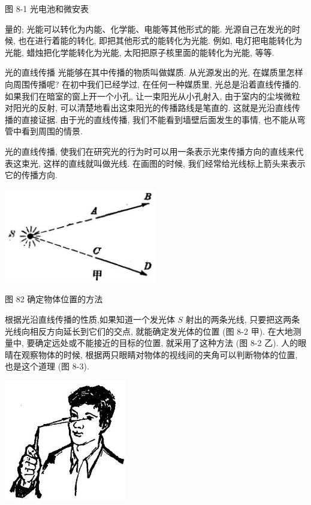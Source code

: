\documentclass[10pt]{article}
\begin{document}
图 8-1 光电池和微安表

量的; 光能可以转化为内能、化学能、电能等其他形式的能. 光源自己在发光的时候, 也在进行着能的转化, 即把其他形式的能转化为光能. 例如, 电灯把电能转化为光能, 蜡烛把化学能转化为光能, 太阳把原子核里面的能转化为光能, 等等.

光的直线传播 光能够在其中传播的物质叫做媒质. 从光源发出的光, 在媒质里怎样向周围传播呢? 在初中我们已经学过, 在任何一种媒质里, 光总是沿着直线传播的. 如果我们在暗室的窗上开一个小孔, 让一束阳光从小孔射入, 由于室内的尘埃微粒对阳光的反射, 可以清楚地看出这束阳光的传播路线是笔直的. 这就是光沿直线传播的直接证据. 由于光的直线传播, 我们不能看到墙壁后面发生的事情, 也不能从弯管中看到周围的情景.

光的直线传播, 使我们在研究光的行为时可以用一条表示光束传播方向的直线来代表这束光, 这样的直线就叫做光线. 在画图的时候, 我们经常给光线标上箭头来表示它的传播方向.

\begin{center}
\includegraphics[max width=0.5\textwidth]{images/01913056-1f15-74d8-9184-9aab52c9d66b_244_655978.jpg}
\end{center}

图 82 确定物体位置的方法

根据光沿直线传播的性质,如果知道一个发光体 \(S\) 射出的两条光线, 只要把这两条光线向相反方向延长到它们的交点, 就能确定发光体的位置 (图 8-2 甲). 在大地测量中, 要确定远处或不能接近的目标的位置, 就采用了这种方法 (图 8-2 乙). 人的眼 晴在观察物体的时候, 根据两只眼睛对物体的视线间的夹角可以判断物体的位置, 也是这个道理 (图 8-3).

\begin{center}
\includegraphics[max width=0.4\textwidth]{images/01913056-1f15-74d8-9184-9aab52c9d66b_245_818804.jpg}
\end{center}
\end{document}
